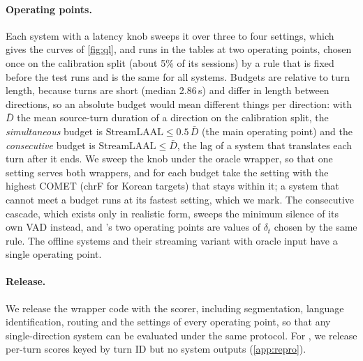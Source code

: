 \paragraph{Operating points.}
Each system with a latency knob sweeps it over three to four settings, which gives the curves of \cref{fig:ql}, and runs in the tables at two operating points, chosen once on the \syn calibration split (about 5\% of its sessions) by a rule that is fixed before the test runs and is the same for all systems. Budgets are relative to turn length, because \taxi turns are short (median 2.86\,s) and differ in length between directions, so an absolute budget would mean different things per direction: with $\bar D$ the mean source-turn duration of a direction on the calibration split, the \emph{simultaneous} budget is $\mathrm{StreamLAAL}\le0.5\,\bar D$ (the main operating point) and the \emph{consecutive} budget is $\mathrm{StreamLAAL}\le\bar D$, the lag of a system that translates each turn after it ends. We sweep the knob under the oracle wrapper, so that one setting serves both wrappers, and for each budget take the setting with the highest COMET (chrF for Korean targets) that stays within it; a system that cannot meet a budget runs at its fastest setting, which we mark. The consecutive cascade, which exists only in realistic form, sweeps the minimum silence of its own VAD instead, and \model's two operating points are values of $\delta_t$ chosen by the same rule. The offline systems and their streaming variant with oracle input have a single operating point.

\paragraph{Release.}
We release the wrapper code with the scorer, including segmentation, language identification, routing and the settings of every operating point, so that any single-direction system can be evaluated under the same protocol. For \taxi, we release per-turn scores keyed by turn ID but no system outputs (\cref{app:repro}).

